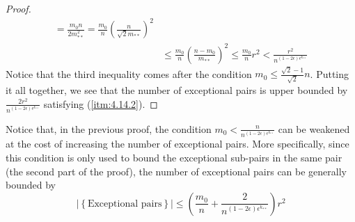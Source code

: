 \begin{proof}
\[\begin{split}
                            = \frac{m_0 n}{2 m_{**}^2}
                            = \frac{m_0}{n} \left( \frac{n}{\sqrt{2}m_{**}} \right)^2 \\
                        & \leq \frac{m_0}{n} \left( \frac{n - m_0}{m_{**}} \right)^2
                            \leq \frac{m_0}{n} r^2
                            < \frac{r^2}{n^{(1-2\epsilon) \epsilon^{k_{**}}}}
                \end{split}
            \]
            Notice that the third inequality comes after the condition $m_0 \leq \frac{\sqrt{2}-1}{\sqrt{2}} n$.
            Putting it all together, we see that the number of exceptional pairs is upper bounded by
                $\frac{2r^2}{n^{(1-2\epsilon)\epsilon^{k_{**}}}}$ satisfying (\ref{itm:4.14.2}).
        \end{proof}

    \remark[Remark 4.15]
        Notice that, in the previous proof, the condition $m_0 < \frac{n}{n^{(1-2\epsilon)\epsilon^{k_{**}}}}$ can be
        weakened at the cost of increasing the number of exceptional pairs.
        More specifically, since this condition is only used to bound the exceptional sub-pairs in the same pair
        (the second part of the proof), the number of exceptional pairs can be generally bounded by
        \[
            |\left\{ \text{Exceptional pairs} \right\}|
                \leq \left( \frac{m_0}{n} + \frac{2}{n^{(1-2\epsilon)\epsilon^{k_{**}}}} \right) r^2
        \]

